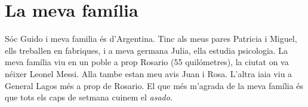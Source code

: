 \documentclass[a4paper,12pt,twoside]{book}
\begin{document}
\chapter*{La meva fam\'ilia}

S\'oc Guido i meva familia és d'Argentina. Tinc als meus pares Patricia 
i Miguel, ells treballen en fabriques, i a meva germana Julia, ella 
estudia psicologia. 
La meva fam\'ilia viu en un poble a prop Rosario (55 quil\'ometres), 
la ciutat on va n\'eixer Leonel Messi. Alla tambe estan meu avis Juan i
Rosa. L'altra iaia viu a General Lagos m\'es a prop de Rosario.
El que m\'es m'agrada de la meva fam\'ilia \'es que tots els caps de 
setmana cuinem el \emph{asado}.
\end{document}

